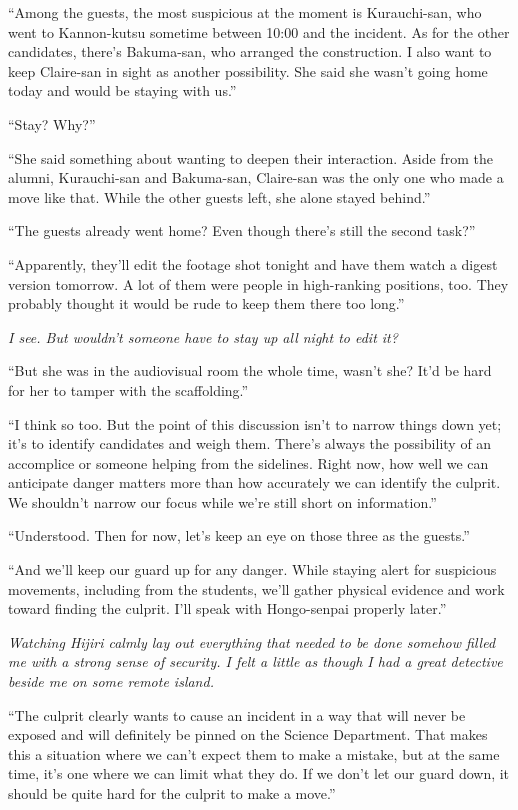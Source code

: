 \documentclass[
    a4paper,
    12pt,
    twoside,
    openany,
    UTF8,
    fontset=windows
]{ctexbook}
\begin{document}
``Among the guests, the most suspicious at the moment is Kurauchi-san, who went to Kannon-kutsu sometime between 10:00 and the incident. As for the other candidates, there's Bakuma-san, who arranged the construction. I also want to keep Claire-san in sight as another possibility. She said she wasn't going home today and would be staying with us.''

``Stay? Why?''

``She said something about wanting to deepen their interaction. Aside from the alumni, Kurauchi-san and Bakuma-san, Claire-san was the only one who made a move like that. While the other guests left, she alone stayed behind.''

``The guests already went home? Even though there's still the second task?''

``Apparently, they'll edit the footage shot tonight and have them watch a digest version tomorrow. A lot of them were people in high-ranking positions, too. They probably thought it would be rude to keep them there too long.''

\textit{I see. But wouldn't someone have to stay up all night to edit it?}

``But she was in the audiovisual room the whole time, wasn't she? It'd be hard for her to tamper with the scaffolding.''

``I think so too. But the point of this discussion isn't to narrow things down yet; it's to identify candidates and weigh them. There's always the possibility of an accomplice or someone helping from the sidelines. Right now, how well we can anticipate danger matters more than how accurately we can identify the culprit. We shouldn't narrow our focus while we're still short on information.''

``Understood. Then for now, let's keep an eye on those three as the guests.''

``And we'll keep our guard up for any danger. While staying alert for suspicious movements, including from the students, we'll gather physical evidence and work toward finding the culprit. I'll speak with Hongo-senpai properly later.''

\textit{Watching Hijiri calmly lay out everything that needed to be done somehow filled me with a strong sense of security. I felt a little as though I had a great detective beside me on some remote island.}

``The culprit clearly wants to cause an incident in a way that will never be exposed and will definitely be pinned on the Science Department. That makes this a situation where we can't expect them to make a mistake, but at the same time, it's one where we can limit what they do. If we don't let our guard down, it should be quite hard for the culprit to make a move.''
\end{document}

